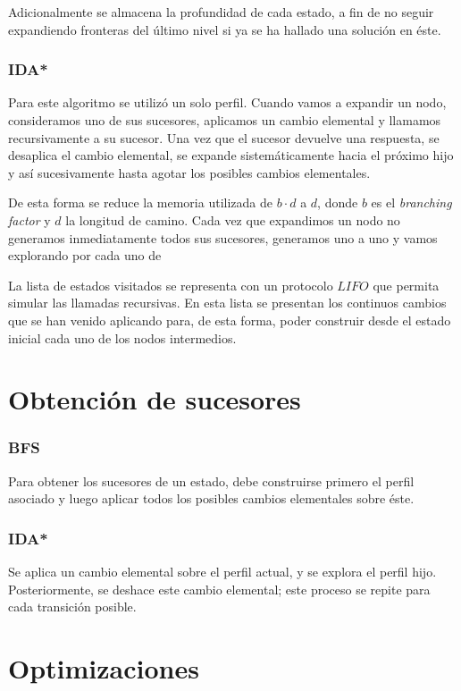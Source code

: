 \documentclass[letterpaper,12pt, titlepage]{article}
\begin{document}
Adicionalmente se almacena la profundidad de cada estado, a fin de no
seguir expandiendo fronteras del último nivel si ya se ha hallado una
solución en éste.

\subsubsection*{IDA*}

Para este algoritmo se utilizó un solo perfil. Cuando vamos a expandir
un nodo, consideramos uno de sus sucesores, aplicamos un cambio elemental
y llamamos recursivamente a su sucesor. Una vez que el sucesor devuelve
una respuesta, se desaplica el cambio elemental, se expande sistemáticamente
hacia el próximo hijo y así sucesivamente hasta agotar los posibles cambios
elementales. 

De esta forma se reduce la memoria utilizada de $b\cdot d$ a $d$, donde
$b$ es el \textit{branching factor} y $d$ la longitud de camino. Cada
vez que expandimos un nodo no generamos inmediatamente todos sus
sucesores, generamos uno a uno y vamos explorando por cada uno de 

La lista de estados visitados se representa con un protocolo $LIFO$ que
permita simular las llamadas recursivas. En esta lista se presentan los
continuos cambios que se han venido aplicando para, de esta forma, poder
construir desde el estado inicial cada uno de los nodos intermedios.

\section{Obtención de sucesores}
\subsubsection*{BFS}
    Para obtener los sucesores de un estado, debe construirse primero
    el perfil asociado y luego aplicar todos los posibles cambios elementales
    sobre éste.

\subsubsection*{IDA*}
    Se aplica un cambio elemental sobre
    el perfil actual, y se explora el perfil hijo. Posteriormente,
    se deshace este cambio elemental; este proceso se repite para
   cada transición posible.

\section{Optimizaciones}
\end{document}
